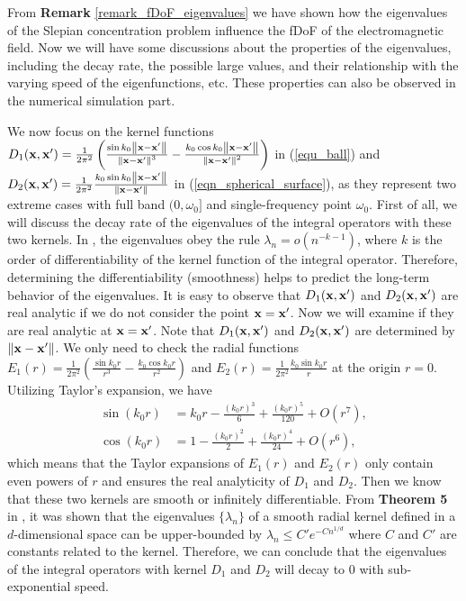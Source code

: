 \documentclass[12pt,draftclsnofoot,journal,onecolumn]{IEEEtran}
\begin{document}
{\color{red}

From {\bf Remark} \ref{remark_fDoF_eigenvalues} we have shown how the eigenvalues of the Slepian concentration problem influence the fDoF of the electromagnetic field. Now we will have some discussions about the properties of the eigenvalues, including the decay rate, the possible large values, and their relationship with the varying speed of the eigenfunctions, etc. These properties can also be observed in the numerical simulation part. 

We now focus on the kernel functions $D_1({\bf x},{\bf x}')=\frac{1}{2\pi^2} \left( \frac{\sin k_0\left\| {\bf x}-{\bf x}' \right\|}{\left\| {\bf x}-{\bf x}' \right\|^3}-\frac{k_0\cos k_0\left\| {\bf x}-{\bf x}' \right\|}{\left\| {\bf x}-{\bf x}' \right\|^2} \right)$ in (\ref{equ_ball}) and $D_2({\bf x},{\bf x}') = \frac{1}{2\pi^2} \frac{k_0\sin k_0 \left\| {\bf x}-{\bf x}' \right\|}{\left\|  {\bf x}-{\bf x}' \right\|}$ in (\ref{eqn_spherical_surface}), as they represent two extreme cases with full band $(0,\omega_0]$ and single-frequency point $\omega_0$. First of all, we will discuss the decay rate of the eigenvalues of the integral operators with these two kernels. In \cite{reade1983eigen}, the eigenvalues obey the rule $\lambda_n  = o(n^{-k-1})$, where $k$ is the order of differentiability of the kernel function of the integral operator. Therefore, determining the differentiability (smoothness) helps to predict the long-term behavior of the eigenvalues.
It is easy to observe that $D_1({\bf x},{\bf x}')$ and $D_2({\bf x},{\bf x}')$ are real analytic if we do not consider the point ${\bf x} = {\bf x}'$. Now we will examine if they are real analytic at ${\bf x} = {\bf x}'$. 
Note that $D_1({\bf x},{\bf x}')$ and $D_2({\bf x},{\bf x}')$ are determined by $\left\|{\bf x}-{\bf x}'\right\|$. We only need to check the radial functions $E_1(r) = \frac{1}{2\pi^2} \left( \frac{\sin k_0 r}{r^3} - \frac{k_0 \cos k_0 r}{r^2} \right)$ and $E_2(r) = \frac{1}{2 \pi^2} \frac{k_0 \sin k_0 r}{r}$ at the origin $r = 0$. Utilizing Taylor's expansion, we have 
\begin{equation}\begin{aligned}\sin(k_0r)&=k_0r-\frac{(k_0r)^3}{6}+\frac{(k_0r)^5}{120}+O(r^7),\\\cos(k_0r)&=1-\frac{(k_0r)^2}{2}+\frac{(k_0r)^4}{24}+O(r^6),\end{aligned}\end{equation}
which means that the Taylor expansions of $E_1(r)$ and $E_2(r)$ only contain even powers of $r$ and ensures the real analyticity of $D_1$ and $D_2$. Then we know that these two kernels are smooth or infinitely differentiable. From {\bf Theorem 5} in \cite{belkin2018approximation}, it was shown that the eigenvalues $\{\lambda_n\}$ of a smooth radial kernel defined in a $d$-dimensional space can be upper-bounded by $\lambda_n \leqslant C' e^{-C n^{1/d}}$ where $C$ and $C'$ are constants related to the kernel. Therefore, we can conclude that the eigenvalues of the integral operators with kernel $D_1$ and $D_2$ will decay to 0 with sub-exponential speed.   

}
\end{document}
